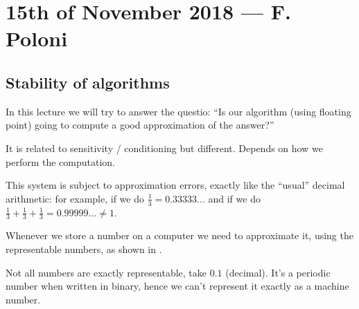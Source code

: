 \documentclass[ComputationalMathematics.tex]{subfiles}
\begin{document}
\section{15th of November 2018 --- F. Poloni}

\subsection{Stability of algorithms}

In this lecture we will try to answer the questio: ``Is our algorithm (using floating point) going to compute a good approximation of the answer?''

It is related to sensitivity / conditioning but different. Depends on how we perform the computation.


This system is subject to approximation errors, exactly like the ``usual'' decimal arithmetic: for example, if we do $\frac{1}{3} = 0.33333 \ldots$ and if we do $\frac{1}{3} + \frac{1}{3} + \frac{1}{3} = 0.99999 \ldots \neq 1$. 

Whenever we store a number on a computer we need to approximate it, using the representable numbers, as shown in .


Not all numbers are exactly representable, take $0.1$ (decimal). It's a periodic number when written in binary, hence we can't represent it exactly as a machine number.
\end{document}
